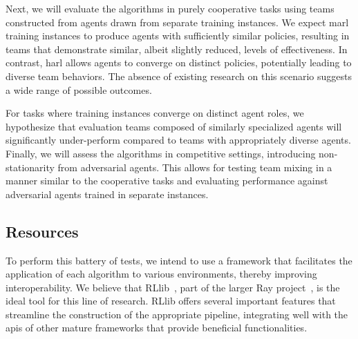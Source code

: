 Next, we will evaluate the algorithms in purely cooperative tasks using 
teams constructed from agents drawn from separate training instances. 
We expect \gls{marl} training instances to produce agents with sufficiently 
similar policies, resulting in teams that demonstrate similar, 
albeit slightly reduced, levels of effectiveness. In contrast, 
\gls{harl} allows agents to converge on distinct policies, 
potentially leading to diverse team behaviors. The absence of existing 
research on this scenario suggests a wide range of possible outcomes.

For tasks where training instances converge on distinct agent roles, 
we hypothesize that evaluation teams composed of similarly specialized 
agents will significantly under-perform compared to teams 
with appropriately diverse agents. Finally, we will assess the algorithms 
in competitive settings, introducing non-stationarity from adversarial agents. 
This allows for testing team mixing in a manner similar to the cooperative 
tasks and evaluating performance against adversarial agents trained in 
separate instances.

\subsection{Resources}
To perform this battery of tests, we intend to use a framework that 
facilitates the application of each algorithm to various environments, 
thereby improving interoperability. We believe that RLlib~\cite{liang2018}, 
part of the larger Ray project~\cite{zotero-2599}, 
is the ideal tool for this line of research. RLlib offers several important 
features that streamline the construction of the appropriate pipeline, 
integrating well with the \glspl{api} of other mature frameworks that 
provide beneficial functionalities.

